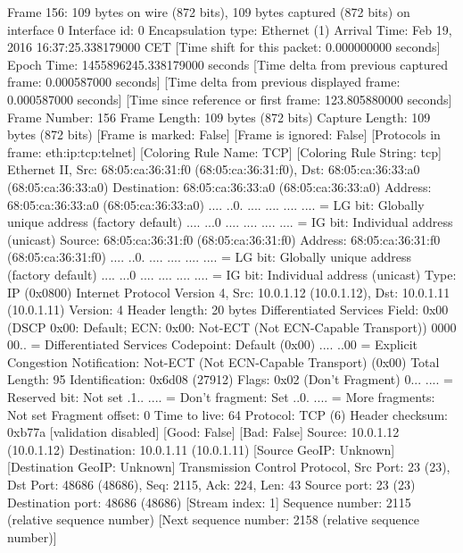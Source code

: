 Frame 156: 109 bytes on wire (872 bits), 109 bytes captured (872 bits) on interface 0
    Interface id: 0
    Encapsulation type: Ethernet (1)
    Arrival Time: Feb 19, 2016 16:37:25.338179000 CET
    [Time shift for this packet: 0.000000000 seconds]
    Epoch Time: 1455896245.338179000 seconds
    [Time delta from previous captured frame: 0.000587000 seconds]
    [Time delta from previous displayed frame: 0.000587000 seconds]
    [Time since reference or first frame: 123.805880000 seconds]
    Frame Number: 156
    Frame Length: 109 bytes (872 bits)
    Capture Length: 109 bytes (872 bits)
    [Frame is marked: False]
    [Frame is ignored: False]
    [Protocols in frame: eth:ip:tcp:telnet]
    [Coloring Rule Name: TCP]
    [Coloring Rule String: tcp]
Ethernet II, Src: 68:05:ca:36:31:f0 (68:05:ca:36:31:f0), Dst: 68:05:ca:36:33:a0 (68:05:ca:36:33:a0)
    Destination: 68:05:ca:36:33:a0 (68:05:ca:36:33:a0)
        Address: 68:05:ca:36:33:a0 (68:05:ca:36:33:a0)
        .... ..0. .... .... .... .... = LG bit: Globally unique address (factory default)
        .... ...0 .... .... .... .... = IG bit: Individual address (unicast)
    Source: 68:05:ca:36:31:f0 (68:05:ca:36:31:f0)
        Address: 68:05:ca:36:31:f0 (68:05:ca:36:31:f0)
        .... ..0. .... .... .... .... = LG bit: Globally unique address (factory default)
        .... ...0 .... .... .... .... = IG bit: Individual address (unicast)
    Type: IP (0x0800)
Internet Protocol Version 4, Src: 10.0.1.12 (10.0.1.12), Dst: 10.0.1.11 (10.0.1.11)
    Version: 4
    Header length: 20 bytes
    Differentiated Services Field: 0x00 (DSCP 0x00: Default; ECN: 0x00: Not-ECT (Not ECN-Capable Transport))
        0000 00.. = Differentiated Services Codepoint: Default (0x00)
        .... ..00 = Explicit Congestion Notification: Not-ECT (Not ECN-Capable Transport) (0x00)
    Total Length: 95
    Identification: 0x6d08 (27912)
    Flags: 0x02 (Don't Fragment)
        0... .... = Reserved bit: Not set
        .1.. .... = Don't fragment: Set
        ..0. .... = More fragments: Not set
    Fragment offset: 0
    Time to live: 64
    Protocol: TCP (6)
    Header checksum: 0xb77a [validation disabled]
        [Good: False]
        [Bad: False]
    Source: 10.0.1.12 (10.0.1.12)
    Destination: 10.0.1.11 (10.0.1.11)
    [Source GeoIP: Unknown]
    [Destination GeoIP: Unknown]
Transmission Control Protocol, Src Port: 23 (23), Dst Port: 48686 (48686), Seq: 2115, Ack: 224, Len: 43
    Source port: 23 (23)
    Destination port: 48686 (48686)
    [Stream index: 1]
    Sequence number: 2115    (relative sequence number)
    [Next sequence number: 2158    (relative sequence number)]
